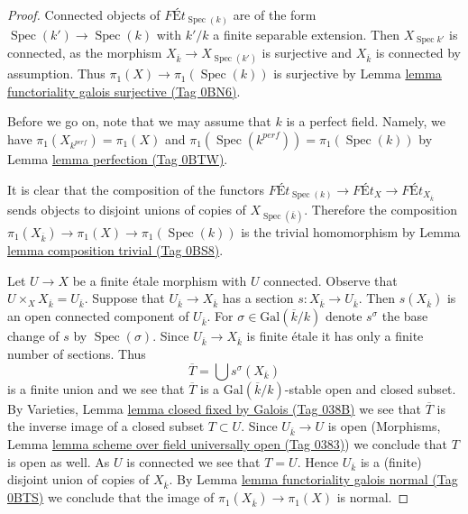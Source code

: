 \documentclass{amsart}
\theoremstyle{plain}
\theoremstyle{definition}
\theoremstyle{remark}
\numberwithin{equation}{subsection}
\def\Spec{\mathop{\mathrm{Spec}}}
\begin{document}
\begin{proof}
Connected objects of $\textit{F\'Et}_{\Spec(k)}$ are of the form
$\Spec(k') \to \Spec(k)$ with $k'/k$ a finite separable extension.
Then $X_{\Spec{k'}}$ is connected, as the morphism
$X_{\overline{k}} \to X_{\Spec(k')}$ is surjective and
$X_{\overline{k}}$ is connected by assumption. Thus
$\pi_1(X) \to \pi_1(\Spec(k))$ is surjective by
Lemma \href{https://stacks.math.columbia.edu/tag/0BN6}{lemma functoriality galois surjective (Tag 0BN6)}.

\medskip\noindent
Before we go on, note that we may assume that $k$ is a perfect field.
Namely, we have $\pi_1(X_{k^{perf}}) = \pi_1(X)$ and
$\pi_1(\Spec(k^{perf})) = \pi_1(\Spec(k))$ by Lemma \href{https://stacks.math.columbia.edu/tag/0BTW}{lemma perfection (Tag 0BTW)}.

\medskip\noindent
It is clear that the composition of the functors
$\textit{F\'Et}_{\Spec(k)} \to \textit{F\'Et}_X \to
\textit{F\'Et}_{X_{\overline{k}}}$ sends objects to disjoint unions
of copies of $X_{\Spec(\overline{k})}$. Therefore the composition
$\pi_1(X_{\overline{k}}) \to \pi_1(X) \to \pi_1(\Spec(k))$
is the trivial homomorphism by Lemma \href{https://stacks.math.columbia.edu/tag/0BS8}{lemma composition trivial (Tag 0BS8)}.

\medskip\noindent
Let $U \to X$ be a finite \'etale morphism with $U$ connected.
Observe that $U \times_X X_{\overline{k}} = U_{\overline{k}}$.
Suppose that $U_{\overline{k}} \to X_{\overline{k}}$
has a section $s : X_{\overline{k}} \to U_{\overline{k}}$.
Then $s(X_{\overline{k}})$ is an open connected component of
$U_{\overline{k}}$. For $\sigma \in \text{Gal}(\overline{k}/k)$
denote $s^\sigma$ the base change of $s$ by $\Spec(\sigma)$.
Since $U_{\overline{k}} \to X_{\overline{k}}$ is finite \'etale
it has only a finite number of sections. Thus
$$
\overline{T} = \bigcup s^\sigma(X_{\overline{k}})
$$
is a finite union and we see that $\overline{T}$ is a
$\text{Gal}(\overline{k}/k)$-stable open and closed subset.
By Varieties, Lemma \href{https://stacks.math.columbia.edu/tag/038B}{lemma closed fixed by Galois (Tag 038B)}
we see that $\overline{T}$ is the inverse image of a closed
subset $T \subset U$. Since $U_{\overline{k}} \to U$ is open
(Morphisms, Lemma \href{https://stacks.math.columbia.edu/tag/0383}{lemma scheme over field universally open (Tag 0383)})
we conclude that $T$ is open as well. As $U$ is connected we
see that $T = U$. Hence $U_{\overline{k}}$ is a (finite) disjoint
union of copies of $X_{\overline{k}}$. By
Lemma \href{https://stacks.math.columbia.edu/tag/0BTS}{lemma functoriality galois normal (Tag 0BTS)} we conclude that the image of
$\pi_1(X_{\overline{k}}) \to \pi_1(X)$ is normal.


\end{proof}
\end{document}
